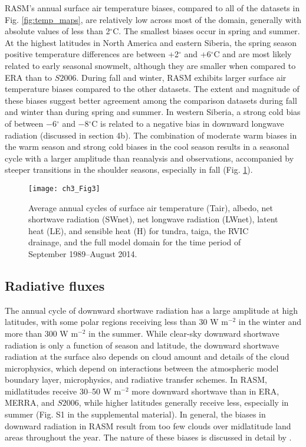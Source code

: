 RASM’s annual surface air temperature biases, compared to all of the datasets in Fig. \ref{fig:temp_maps}, are relatively low across most of the domain, generally with absolute values of less than 2$^{\circ}$C.
The smallest biases occur in spring and summer.
At the highest latitudes in North America and eastern Siberia, the spring season positive temperature differences are between +2$^{\circ}$ and +6$^{\circ}$C and are most likely related to early seasonal snowmelt, although they are smaller when compared to ERA than to $S2006$.
During fall and winter, RASM exhibits larger surface air temperature biases compared to the other datasets.
The extent and magnitude of these biases suggest better agreement among the comparison datasets during fall and winter than during spring and summer.
In western Siberia, a strong cold bias of between −6$^{\circ}$ and −8$^{\circ}$C is related to a negative bias in downward longwave radiation (discussed in section 4b).
The combination of moderate warm biases in the warm season and strong cold biases in the cool season results in a seasonal cycle with a larger amplitude than reanalysis and observations, accompanied by steeper transitions in the shoulder seasons, especially in fall (Fig. \ref{fig:energy_cycle}).

\begin{figure}
  \centering
  \texttt{[image: ch3\_Fig3]}
  \caption{Average annual cycles of surface air temperature (Tair), albedo, net shortwave radiation (SWnet), net longwave radiation (LWnet), latent heat (LE), and sensible heat (H) for tundra, taiga, the RVIC drainage, and the full model domain for the time period of September 1989–August 2014.}
  \label{fig:energy_cycle}
\end{figure}

\subsection{Radiative fluxes}

The annual cycle of downward shortwave radiation has a large amplitude at high latitudes, with some polar regions receiving less than 30 W m$^{−2}$ in the winter and more than 300 W m$^{−2}$ in the summer.
While clear-sky downward shortwave radiation is only a function of season and latitude, the downward shortwave radiation at the surface also depends on cloud amount and details of the cloud microphysics, which depend on interactions between the atmospheric model boundary layer, microphysics, and radiative transfer schemes.
In RASM, midlatitudes receive 30–50 W m$^{−2}$ more downward shortwave than in ERA, MERRA, and $S2006$, while higher latitudes generally receive less, especially in summer (Fig. S1 in the supplemental material).
In general, the biases in downward radiation in RASM result from too few clouds over midlatitude land areas throughout the year.
The nature of these biases is discussed in detail by \citet{Cassano_2016}.

